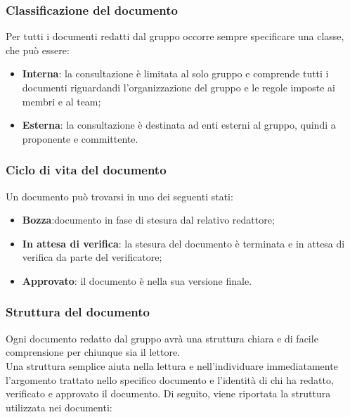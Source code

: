 		\subsubsection{Classificazione del documento}
		Per tutti i documenti redatti dal gruppo occorre sempre specificare una classe, che può essere:
		\begin{itemize}
		\item \textbf{Interna}: la consultazione è limitata al solo gruppo e comprende tutti i documenti riguardandi l'organizzazione del gruppo e le regole imposte ai membri e al team;
		\item \textbf{Esterna}: la consultazione è destinata ad enti esterni al gruppo, quindi a proponente e committente.
		\end{itemize} 
	
		\subsubsection{Ciclo di vita del documento}
		Un documento può trovarsi in uno dei seguenti stati:
		\begin{itemize}
			\item \textbf{Bozza}:documento in fase di stesura dal relativo redattore;
			\item \textbf{In attesa di verifica}: la stesura del documento è terminata e in attesa di verifica da parte del verificatore;
			\item \textbf{Approvato}: il documento è nella sua versione finale.
		\end{itemize}
	
		\subsubsection{Struttura del documento}
		Ogni documento redatto dal gruppo avrà una struttura chiara e di facile comprensione per chiunque sia il lettore.\\
		Una struttura semplice aiuta nella lettura e nell'individuare immediatamente l'argomento trattato nello specifico documento e l'identità di chi ha redatto, verificato e approvato il documento.
		Di seguito, viene riportata la struttura utilizzata nei documenti:

